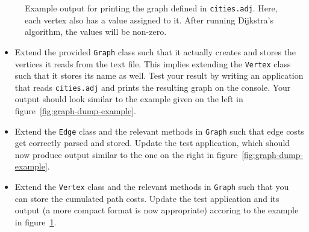 \documentclass[a4paper,10pt]{article}
\begin{document}
\begin{figure}
  \centering
  \fbox{
    \begin{minipage}{\columnwidth}
      \footnotesize
      
  \end{minipage}}
  \caption{
    Example output for printing the graph defined in \texttt{cities.adj}.
    Here, each vertex also has a value assigned to it.
    After running Dijkstra's algorithm, the values will be non-zero.
  }\label{fig:graph-dump-example-vc}
\end{figure}

\begin{itemize}

\item
  Extend the provided \texttt{Graph} class such that it actually creates and stores the vertices it reads from the text file.
  This implies extending the \texttt{Vertex} class such that it stores its name as well.
  Test your result by writing an application that reads \texttt{cities.adj} and prints the resulting graph on the console.
  Your output should look similar to the example given on the left in figure~\ref{fig:graph-dump-example}.
  
\item
  Extend the \texttt{Edge} class and the relevant methods in \texttt{Graph} such that edge costs get correctly parsed and stored.
  Update the test application, which should now produce output similar to the one on the right in figure~\ref{fig:graph-dump-example}.

\item
  Extend the \texttt{Vertex} class and the relevant methods in \texttt{Graph} such that you can store the cumulated path costs.
  Update the test application and its output (a more compact format is now appropriate) accoring to the example in figure~\ref{fig:graph-dump-example-vc}.


\end{itemize}
\end{document}
